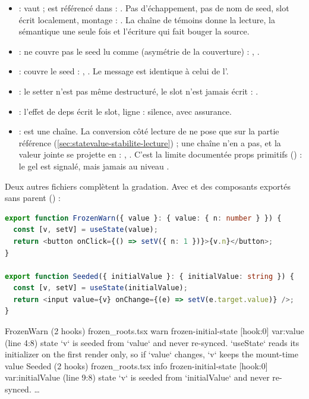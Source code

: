 \begin{itemize}
  \item {} :  vaut  ;  est référencé dans  : . Pas d'échappement, pas de nom de seed, slot écrit localement, montage  : \Error. La chaîne de témoins donne la lecture, la sémantique \og une seule fois\fg{} et l'écriture qui fait bouger la source.
  \item {} :  ne couvre pas le seed lu comme  (asymétrie de la couverture) : , \Error.
  \item {} :  couvre le seed : , \Info. Le message est identique à celui de l'\Error.
  \item {} : le setter n'est pas même destructuré, le slot n'est jamais écrit : \Info.
  \item {} : l'effet de deps \code{[user]} écrit le slot, ligne  : silence, avec assurance.
  \item {} :  est une chaîne. La conversion côté lecture de  ne pose  que sur la partie référence (\cref{sec:statevalue-stabilite-lecture}) ; une chaîne n'en a pas, et la valeur jointe  se projette en  : , \Warning. C'est la limite documentée \og props primitifs\fg{} () : le gel est signalé, mais jamais au niveau \Error.
\end{itemize}

Deux autres fichiers complètent la gradation. Avec  et des composants exportés sans parent () :

\begin{lstlisting}[language=TypeScript,firstnumber=3,caption={Props ⊤ (\file{/tmp/ch18/frozen_roots.tsx}, élagué de l'import)},label={lst:regles-etat-frozen-roots}]
export function FrozenWarn({ value }: { value: { n: number } }) {
  const [v, setV] = useState(value);
  return <button onClick={() => setV({ n: 1 })}>{v.n}</button>;
}

export function Seeded({ initialValue }: { initialValue: string }) {
  const [v, setV] = useState(initialValue);
  return <input value={v} onChange={(e) => setV(e.target.value)} />;
}
\end{lstlisting}

\begin{sortie}
  FrozenWarn  (2 hooks)  frozen_roots.tsx
    warn   frozen-initial-state  [hook:0]  var:value  (line 4:8)  state `v` is seeded from `value` and never re-synced. `useState` reads its initializer on the first render only, so if `value` changes, `v` keeps the mount-time value
  Seeded  (2 hooks)  frozen_roots.tsx
    info   frozen-initial-state  [hook:0]  var:initialValue  (line 9:8)  state `v` is seeded from `initialValue` and never re-synced. …
\end{sortie}

